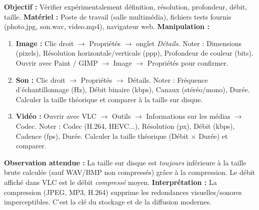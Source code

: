 \documentclass[11pt]{article}
\begin{document}
\begin{experience}
\textbf{Objectif :} Vérifier expérimentalement définition, résolution, profondeur, débit, taille.
\textbf{Matériel :} Poste de travail (salle multimédia), fichiers tests fournis (photo.jpg, son.wav, video.mp4), navigateur web.
\textbf{Manipulation :}
\begin{enumerate}
\item \textbf{Image :} Clic droit $\to$ Propriétés $\to$ onglet \emph{Détails}. Noter : Dimensions (pixels), Résolution horizontale/verticale (ppp), Profondeur de couleur (bits). Ouvrir avec Paint / GIMP $\to$ Image $\to$ Propriétés pour confirmer.
\item \textbf{Son :} Clic droit $\to$ Propriétés $\to$ Détails. Noter : Fréquence d'échantillonnage (Hz), Débit binaire (kbps), Canaux (stéréo/mono), Durée. Calculer la taille théorique et comparer à la taille sur disque.
\item \textbf{Vidéo :} Ouvrir avec VLC $\to$ Outils $\to$ Informations sur les médias $\to$ Codec. Noter : Codec (H.264, HEVC...), Résolution (px), Débit (kbps), Cadence (fps), Durée. Calculer la taille théorique (Débit $\times$ Durée) et comparer.
\end{enumerate}
\textbf{Observation attendue :} La taille sur disque est \emph{toujours} inférieure à la taille brute calculée (sauf WAV/BMP non compressés) grâce à la compression. Le débit affiché dans VLC est le débit \emph{compressé} moyen.
\textbf{Interprétation :} La compression (JPEG, MP3, H.264) supprime les redondances visuelles/sonores imperceptibles. C'est la clé du stockage et de la diffusion modernes.
\end{experience}
\end{document}
